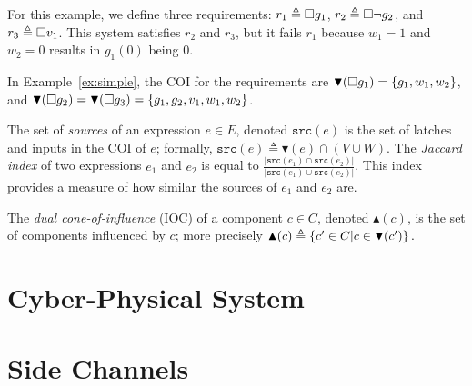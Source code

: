 \begin{example}
For this example, we define three requirements: $r_1\triangleq{{\square}} g_1$, $r_2 \triangleq{{\square}} \lnot g_2$, and $r_3\triangleq{{\square}} v_1$. This system satisfies $r_2$ and $r_3$, but it fails $r_1$ because $w_1=1$ and $w_2=0$ results in $g_1(0)$ being 0.

In Example~\ref{ex:simple}, the COI for the requirements are $\blacktriangledown({{\square}} g_1)=\left\{g_1,w_1,w_2\right\}$, and $\blacktriangledown({{\square}} g_2)=\blacktriangledown({{\square}} g_3)=\left\{g_1,g_2,v_1,w_1,w_2\right\}$.
\end{example}
The set of \emph{sources} of an expression $e\in E$, denoted $\mathtt{src}(e)$ is the set of latches and inputs in the COI of $e$; formally, $\mathtt{src}(e)\triangleq \blacktriangledown(e) \cap (V \cup W)$. The \emph{Jaccard index} of two expressions $e_1$ and $e_2$ is equal to $
\frac{|\mathtt{src}(e_1)\cap \mathtt{src}(e_2)|}{|\mathtt{src}(e_1)\cup\mathtt{src}(e_2)|}
$. This index provides a measure of how similar the sources of $e_1$ and $e_2$ are. 

The \emph{dual cone-of-influence} (IOC) of a component $c \in C$, denoted $\blacktriangle(c)$, is the set of components influenced by $c$; more precisely 
$\blacktriangle(c) \triangleq \left\{c' \in  C | c\in \blacktriangledown(c')\right\}.$


\section{Cyber-Physical System} 
\section{Side Channels}